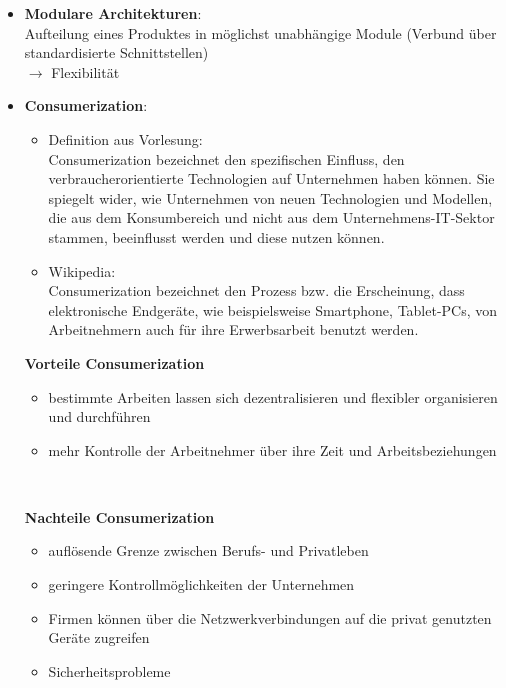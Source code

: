 \documentclass[12pt,a4paper]{article}
\begin{document}
\begin{itemize}
   \item \textbf{Modulare Architekturen}:\\
         Aufteilung eines Produktes in möglichst unabhängige Module (Verbund über standardisierte Schnittstellen)\\
         $\rightarrow$ Flexibilität
         
   \item \textbf{Consumerization}:
      \begin{itemize}
			\item Definition aus Vorlesung: \\
			Consumerization bezeichnet den spezifischen Einfluss, den verbraucherorientierte Technologien auf Unternehmen haben können. Sie spiegelt wider, wie Unternehmen von neuen Technologien und Modellen, die aus dem Konsumbereich und nicht aus dem Unternehmens-IT-Sektor stammen, beeinflusst werden und diese nutzen können.
			\item Wikipedia: \\
			Consumerization bezeichnet den Prozess bzw. die Erscheinung, dass elektronische Endgeräte, wie beispielsweise Smartphone, Tablet-PCs, von Arbeitnehmern auch für ihre Erwerbsarbeit benutzt werden.
      \end{itemize}
      

   \begin{minipage}[t]{0.4\textwidth}

	\textbf{Vorteile Consumerization} 
	\begin{itemize}
	\item bestimmte Arbeiten lassen sich dezentralisieren und flexibler organisieren und durchführen
	\item mehr Kontrolle der Arbeitnehmer über ihre Zeit und Arbeitsbeziehungen
	\end{itemize}

\end{minipage}\begin{minipage}[t]{0.1\textwidth}
   \ 
\end{minipage}\begin{minipage}[t]{0.4\textwidth}

	\textbf{Nachteile Consumerization} 
	\begin{itemize}
	\item auflösende Grenze zwischen Berufs- und Privatleben
	\item geringere Kontrollmöglichkeiten der Unternehmen
	\item Firmen können über die Netzwerkverbindungen auf die privat genutzten Geräte zugreifen
	\item Sicherheitsprobleme
	\end{itemize}


\end{minipage}
\end{itemize}
\end{document}
